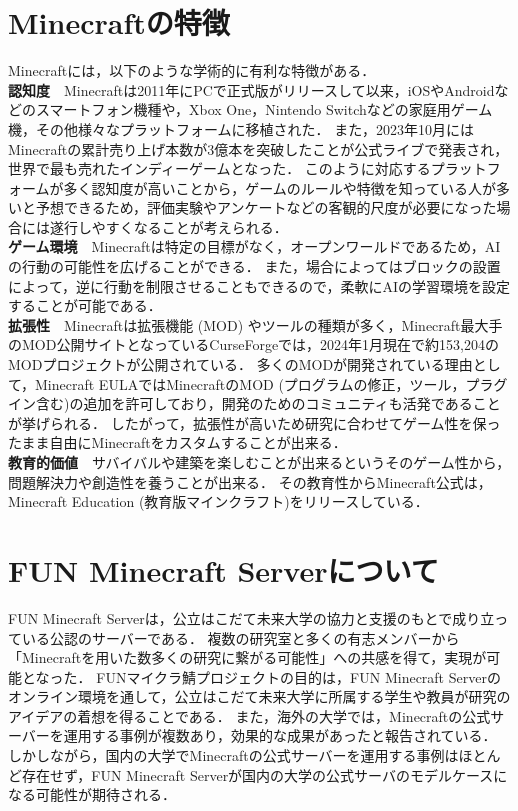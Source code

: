 \section{Minecraftの特徴}\label{sec:minecraft_feature}
Minecraftには，以下のような学術的に有利な特徴がある．\\

\textbf{認知度}　Minecraftは2011年にPCで正式版がリリースして以来，iOSやAndroidなどのスマートフォン機種や，Xbox One，Nintendo Switchなどの家庭用ゲーム機，その他様々なプラットフォームに移植された．
また，2023年10月にはMinecraftの累計売り上げ本数が3億本を突破したことが公式ライブで発表され，世界で最も売れたインディーゲームとなった\cite{bib:minecraft_news}．
このように対応するプラットフォームが多く認知度が高いことから，ゲームのルールや特徴を知っている人が多いと予想できるため，評価実験やアンケートなどの客観的尺度が必要になった場合には遂行しやすくなることが考えられる．\\

\textbf{ゲーム環境}　Minecraftは特定の目標がなく，オープンワールドであるため，AIの行動の可能性を広げることができる．
また，場合によってはブロックの設置によって，逆に行動を制限させることもできるので，柔軟にAIの学習環境を設定することが可能である．\\

\textbf{拡張性}　Minecraftは拡張機能 (MOD) やツールの種類が多く，Minecraft最大手のMOD公開サイトとなっているCurseForge\cite{bib:curseforge}では，2024年1月現在で約153,204のMODプロジェクトが公開されている．
多くのMODが開発されている理由として，Minecraft EULA\cite{bib:eula}ではMinecraftのMOD (プログラムの修正，ツール，プラグイン含む)の追加を許可しており，開発のためのコミュニティも活発であることが挙げられる．
したがって，拡張性が高いため研究に合わせてゲーム性を保ったまま自由にMinecraftをカスタムすることが出来る．\\

\textbf{教育的価値}　サバイバルや建築を楽しむことが出来るというそのゲーム性から，問題解決力や創造性を養うことが出来る．
その教育性からMinecraft公式は，Minecraft Education (教育版マインクラフト)\cite{bib:minecraft_edu}をリリースしている． \\

\section{FUN Minecraft Serverについて}
FUN Minecraft Server\cite{bib:fun_minecraft_server}は，公立はこだて未来大学の協力と支援のもとで成り立っている公認のサーバーである．
複数の研究室と多くの有志メンバーから「Minecraftを用いた数多くの研究に繋がる可能性」への共感を得て，実現が可能となった．
FUNマイクラ鯖プロジェクトの目的は，FUN Minecraft Serverのオンライン環境を通して，公立はこだて未来大学に所属する学生や教員が研究のアイデアの着想を得ることである．
また，海外の大学では，Minecraftの公式サーバーを運用する事例が複数あり，効果的な成果があったと報告されている．
しかしながら，国内の大学でMinecraftの公式サーバーを運用する事例はほとんど存在せず，FUN Minecraft Serverが国内の大学の公式サーバのモデルケースになる可能性が期待される．

